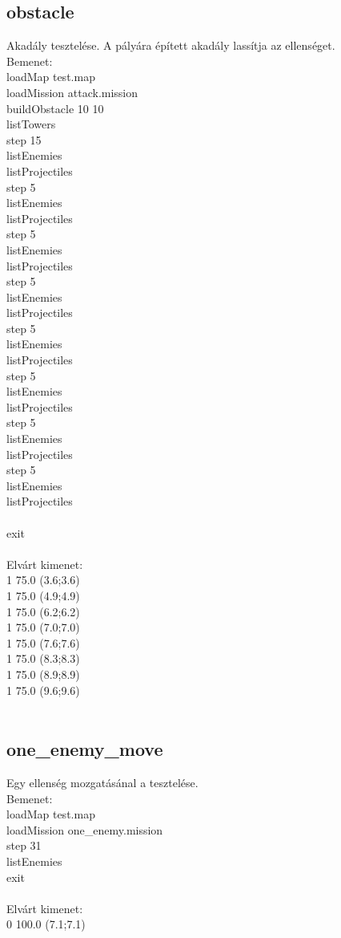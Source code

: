 \subsection{obstacle}
Akadály tesztelése. A pályára épített akadály lassítja az ellenséget.\\
Bemenet:\\
loadMap test.map\\
loadMission attack.mission\\
buildObstacle 10 10\\
listTowers\\
step 15\\
listEnemies\\
listProjectiles\\
step 5\\
listEnemies\\
listProjectiles\\
step 5\\
listEnemies\\
listProjectiles\\
step 5\\
listEnemies\\
listProjectiles\\
step 5\\
listEnemies\\
listProjectiles\\
step 5\\
listEnemies\\
listProjectiles\\
step 5\\
listEnemies\\
listProjectiles\\
step 5\\
listEnemies\\
listProjectiles\\
\\
exit\\
\\
Elvárt kimenet:\\
1 75.0 (3.6;3.6)\\
1 75.0 (4.9;4.9)\\
1 75.0 (6.2;6.2)\\
1 75.0 (7.0;7.0)\\
1 75.0 (7.6;7.6)\\
1 75.0 (8.3;8.3)\\
1 75.0 (8.9;8.9)\\
1 75.0 (9.6;9.6)\\
\\
\subsection{one\_enemy\_move}
Egy ellenség mozgatásánal a tesztelése.\\
Bemenet:\\
loadMap test.map\\
loadMission one\_enemy.mission\\
step 31\\
listEnemies\\
exit\\
\\
Elvárt kimenet:\\
0 100.0 (7.1;7.1)\\

